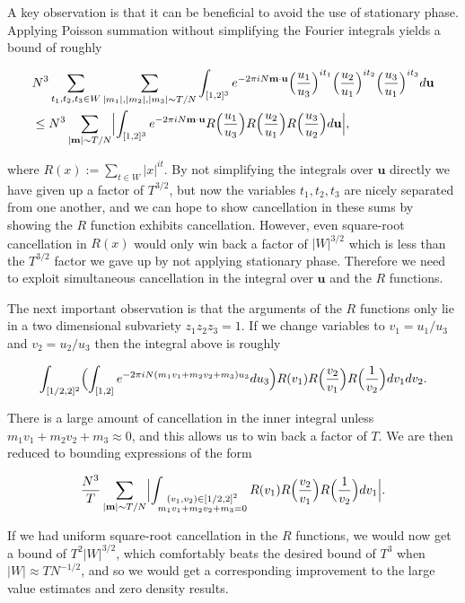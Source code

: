 \documentclass{amsart}
\theoremstyle{plain}
\numberwithin{equation}{section}
\begin{document}
A key observation is that it can be beneficial to avoid the use of stationary phase. Applying Poisson summation without simplifying the Fourier integrals yields a bound of roughly

\begin{align*}
&N^3\sum_{t_1,t_2,t_3\in W}\sum_{|m_1|,|m_2|,|m_3|\sim T/N}\int_{[1,2]^3}e^{-2\pi i N\mathbf{m}\cdot \mathbf{u}}\Bigl(\frac{u_1}{u_3}\Bigr)^{it_1}\Bigl(\frac{u_2}{u_1}\Bigr)^{it_2}\Bigl(\frac{u_3}{u_1}\Bigr)^{it_3}d\mathbf{u}\\
 &\le N^3\sum_{|\mathbf{m}|\sim T/N}\Bigl|\int_{[1,2]^3}e^{-2\pi i N\mathbf{m}\cdot \mathbf{u}} R\Bigl(\frac{u_1}{u_3}\Bigr)R\Bigl(\frac{u_2}{u_1}\Bigr)R\Bigl(\frac{u_3}{u_2}\Bigr)d\mathbf{u}\Bigr|,
\end{align*}

where $R(x):=\sum_{t \in W}|x|^{it}$. By not simplifying the integrals over $\mathbf{u}$ directly we have given up a factor of $T^{3/2}$, but now the variables $t_1,t_2,t_3$ are nicely separated from one another, and we can hope to show cancellation in these sums by showing the $R$ function exhibits cancellation. However, even square-root cancellation in $R(x)$ would only win back a factor of $|W|^{3/2}$ which is less than the $T^{3/2}$ factor we gave up by not applying stationary phase. Therefore we need to exploit simultaneous cancellation in the integral over $\mathbf{u}$ and the $R$ functions.

The next important observation is that the arguments of the $R$ functions only lie in a two dimensional subvariety $z_1z_2z_3=1$. If we change variables to $v_1=u_1/u_3$ and $v_2=u_2/u_3$ then the integral above is roughly

\[
\int_{[1/2,2]^2}\Bigl(\int_{[1,2]} e^{-2\pi i N (m_1 v_1+ m_2 v_2+m_3)u_3}du_3\Bigr)R(v_1)R\Bigl(\frac{v_2}{v_1}\Bigr)R\Bigl(\frac{1}{v_2}\Bigr) dv_1 dv_2.
 \]
 
There is a large amount of cancellation in the inner integral unless $m_1 v_1+ m_2 v_2+m_3\approx 0$, and this allows us to win back a factor of $T$. We are then reduced to bounding expressions of the form

\begin{equation}
 \frac{N^3}{T}\sum_{|\mathbf{m}|\sim T/N}\Bigl| \int_{\substack{(v_1,v_2)\in [1/2,2]^2\\ m_1 v_1+ m_2 v_2+m_3=0}} R(v_1)R\Bigl(\frac{v_2}{v_1}\Bigr)R\Bigl(\frac{1}{v_2}\Bigr) dv_1\Bigr|.
\label{eq:KeySum}
\end{equation}

If we had uniform square-root cancellation in the $R$ functions, we would now get a bound of $T^2 |W|^{3/2}$, which comfortably beats the desired bound of $T^3$ when $|W|\approx TN^{-1/2}$, and so we would get a corresponding improvement to the large value estimates and zero density results.
\end{document}
